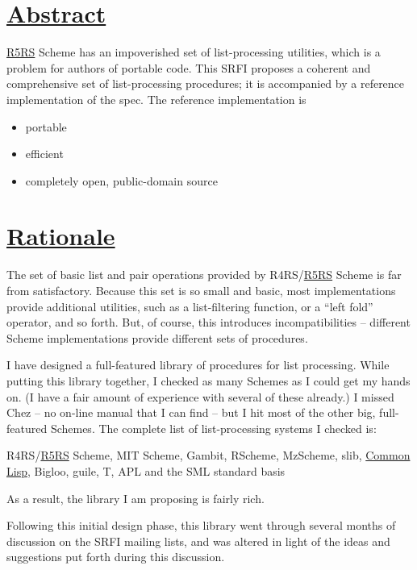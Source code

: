\section{\texorpdfstring{\href{}{Abstract}}{Abstract}}\label{abstract}

\protect\hyperlink{R5RS}{R5RS} Scheme has an impoverished set of
list-processing utilities, which is a problem for authors of portable
code. This SRFI proposes a coherent and comprehensive set of
list-processing procedures; it is accompanied by a reference
implementation of the spec. The reference implementation is

\begin{itemize}
\tightlist
\item
  portable
\item
  efficient
\item
  completely open, public-domain source
\end{itemize}

\section{\texorpdfstring{\href{}{Rationale}}{Rationale}}\label{rationale}

The set of basic list and pair operations provided by
R4RS/\protect\hyperlink{R5RS}{R5RS} Scheme is far from satisfactory.
Because this set is so small and basic, most implementations provide
additional utilities, such as a list-filtering function, or a ``left
fold'' operator, and so forth. But, of course, this introduces
incompatibilities -- different Scheme implementations provide different
sets of procedures.

I have designed a full-featured library of procedures for list
processing. While putting this library together, I checked as many
Schemes as I could get my hands on. (I have a fair amount of experience
with several of these already.) I missed Chez -- no on-line manual that
I can find -- but I hit most of the other big, full-featured Schemes.
The complete list of list-processing systems I checked is:

R4RS/\protect\hyperlink{R5RS}{R5RS} Scheme, MIT Scheme, Gambit, RScheme,
MzScheme, slib, \protect\hyperlink{CommonLisp}{Common Lisp}, Bigloo,
guile, T, APL and the SML standard basis

As a result, the library I am proposing is fairly rich.

Following this initial design phase, this library went through several
months of discussion on the SRFI mailing lists, and was altered in light
of the ideas and suggestions put forth during this discussion.

